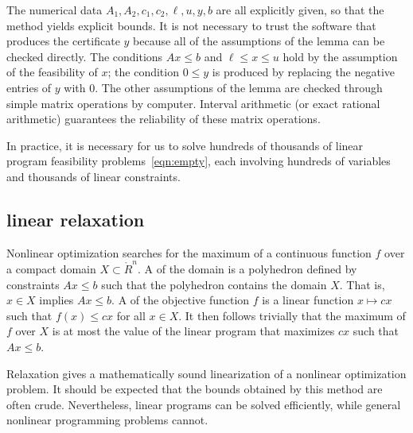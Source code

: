 The numerical data $A_1,A_2,c_1,c_2,\ell,u,y,b$ are all explicitly given,
so that the method yields explicit bounds.
It is not necessary to trust the software
that produces the certificate $y$ because
all of the assumptions of the lemma can be checked directly.
The conditions $A x \le b$ and $\ell\le x\le u$ hold by the assumption
of the feasibility of $x$; the condition $0\le y$ is produced by replacing the
negative entries of $y$ with $0$.  The other assumptions of the lemma are
checked through simple matrix operations by computer.  Interval arithmetic 
(or exact rational arithmetic) guarantees
the reliability of these matrix
operations.

In practice, it is necessary for us to solve hundreds of thousands of
linear program feasibility problems~\eqref{eqn:empty}, each involving
hundreds of variables and thousands of linear constraints.

\subsection{linear relaxation}

%
%
Nonlinear optimization searches for the maximum of a
continuous function $f$ over a compact domain $X\subset \ring{R}^n$.
A  of the domain is a polyhedron defined by
constraints $A x \le b$ such that the polyhedron contains the domain
$X$.  That is, $x\in X$ implies $A x \le b$.  A  of the objective function $f$ is a linear function
$x\mapsto c x$ such that $f(x) \le c x$ for all $x\in X$.  It then
follows trivially that the maximum of $f$ over $X$ is at most the
value of the linear program that maximizes $c x$ such that $A x \le
b$.

Relaxation gives a mathematically sound linearization of a
nonlinear optimization problem.  It should be expected that the bounds
obtained by this method are often  crude.  Nevertheless, linear
programs can be solved efficiently, while general nonlinear
programming problems cannot.


